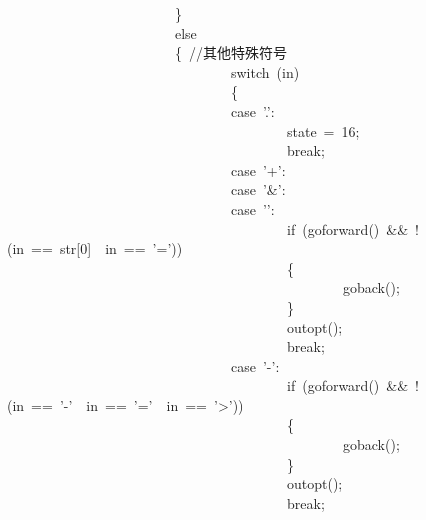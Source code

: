 \documentclass{article}
\begin{document}
\begin{mdpre}
~~~~~~~~~~~~~~~~~~~~~~~~\}\\
~~~~~~~~~~~~~~~~~~~~~~~~{else}\\
~~~~~~~~~~~~~~~~~~~~~~~~\{~{//其他特殊符号}\\
~~~~~~~~~~~~~~~~~~~~~~~~~~~~~~~~{switch}~(in)\\
~~~~~~~~~~~~~~~~~~~~~~~~~~~~~~~~\{\\
~~~~~~~~~~~~~~~~~~~~~~~~~~~~~~~~{case}~{'.'}:\\
~~~~~~~~~~~~~~~~~~~~~~~~~~~~~~~~~~~~~~~~state~=~{16};\\
~~~~~~~~~~~~~~~~~~~~~~~~~~~~~~~~~~~~~~~~{break};\\
~~~~~~~~~~~~~~~~~~~~~~~~~~~~~~~~{case}~{'+'}:\\
~~~~~~~~~~~~~~~~~~~~~~~~~~~~~~~~{case}~{'\&'}:\\
~~~~~~~~~~~~~~~~~~~~~~~~~~~~~~~~{case}~{'\textbar{}'}:\\
~~~~~~~~~~~~~~~~~~~~~~~~~~~~~~~~~~~~~~~~{if}~(goforward()~\&\&~!(in~==~str{}[{0}]~\textbar{}\textbar{}~in~==~{'='}))\\
~~~~~~~~~~~~~~~~~~~~~~~~~~~~~~~~~~~~~~~~\{\\
~~~~~~~~~~~~~~~~~~~~~~~~~~~~~~~~~~~~~~~~~~~~~~~~goback();\\
~~~~~~~~~~~~~~~~~~~~~~~~~~~~~~~~~~~~~~~~\}\\
~~~~~~~~~~~~~~~~~~~~~~~~~~~~~~~~~~~~~~~~outopt();\\
~~~~~~~~~~~~~~~~~~~~~~~~~~~~~~~~~~~~~~~~{break};\\
~~~~~~~~~~~~~~~~~~~~~~~~~~~~~~~~{case}~{'-'}:\\
~~~~~~~~~~~~~~~~~~~~~~~~~~~~~~~~~~~~~~~~{if}~(goforward()~\&\&~!(in~==~{'-'}~\textbar{}\textbar{}~in~==~{'='}~\textbar{}\textbar{}~in~==~{'\textgreater{}'}))\\
~~~~~~~~~~~~~~~~~~~~~~~~~~~~~~~~~~~~~~~~\{\\
~~~~~~~~~~~~~~~~~~~~~~~~~~~~~~~~~~~~~~~~~~~~~~~~goback();\\
~~~~~~~~~~~~~~~~~~~~~~~~~~~~~~~~~~~~~~~~\}\\
~~~~~~~~~~~~~~~~~~~~~~~~~~~~~~~~~~~~~~~~outopt();\\
~~~~~~~~~~~~~~~~~~~~~~~~~~~~~~~~~~~~~~~~{break};\\

\end{mdpre}
\end{document}
